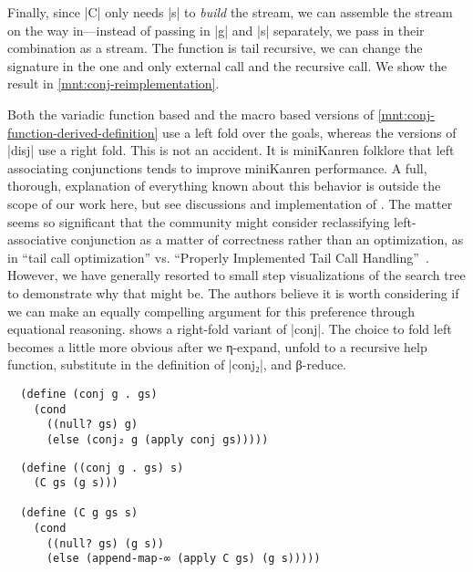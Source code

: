 \documentclass[sigplan,draft,natbib=false]{acmart}
\begin{document}
Finally, since \rackinline|C| only needs \rackinline|s| to
\emph{build} the stream, we can assemble the stream on the way
in---instead of passing in \rackinline|g| and \rackinline|s|
separately, we pass in their combination as a stream. The function is
tail recursive, we can change the signature in the one and only
external call and the recursive call. We show the result
in \cref{mnt:conj-reimplementation}.

Both the variadic function based and the macro based versions of
\cref{mnt:conj-function-derived-definition} use a left fold over the
goals, whereas the versions of \rackinline|disj| use a right fold.
This is not an accident. It is miniKanren folklore that left
associating conjunctions tends to improve miniKanren performance. A
full, thorough, explanation of everything known about this behavior is
outside the scope of our work here, but see discussions and
implementation of \cite{rosenblatt2019first}. The matter seems so
significant that the community might consider reclassifying
left-associative conjunction as a matter of correctness rather than an
optimization, as in \enquote{tail call optimization} vs.
\enquote{Properly Implemented Tail Call
  Handling}~\cite{felleisen2014requestions}. However, we have
generally resorted to small step visualizations of the search tree to
demonstrate why that might be. The authors believe it is worth
considering if we can make an equally compelling argument for this
preference through equational reasoning.
 shows a right-fold variant of
\rackinline|conj|. The choice to fold left becomes a little more
obvious after we η-expand, unfold to a recursive help function,
substitute in the definition of \rackinline|conj₂|, and β-reduce.

\begin{listing}[h]
\begin{verbatim}
  (define (conj g . gs)
    (cond
      ((null? gs) g)
      (else (conj₂ g (apply conj gs)))))
\end{verbatim}
  \caption{A right-fold variant of \rackinline|conj|}
  \label{mnt:conj-right-fold-definition}
\end{listing}

\begin{verbatim}
  (define ((conj g . gs) s)
    (C gs (g s)))

  (define (C g gs s)
    (cond
      ((null? gs) (g s))
      (else (append-map-∞ (apply C gs) (g s)))))
\end{verbatim}
\end{document}
